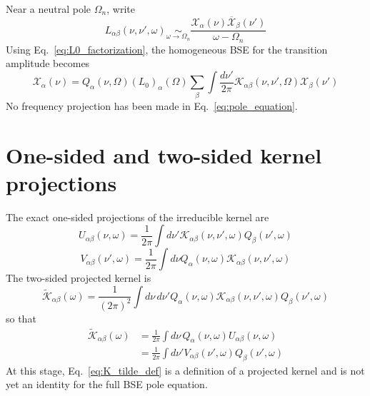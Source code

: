 \documentclass[aip,jcp,reprint,noshowkeys,superscriptaddress]{revtex4-1}
\begin{document}
Near a neutral pole $\Omega_n$, write
\begin{equation}
	L_{\alpha\beta}(\nu,\nu',\omega)
	\underset{\omega\to\Omega_n}{\sim}
	\frac{
	\mathcal X_\alpha(\nu)
	\overline{\mathcal X}_\beta(\nu')
	}{
	\omega-\Omega_n
	}
	\label{eq:pole_form}
\end{equation}
Using Eq.~\eqref{eq:L0_factorization}, the homogeneous BSE for the transition amplitude becomes
\begin{equation}
	\mathcal X_\alpha(\nu)
	=
	Q_\alpha(\nu,\Omega)
	(L_0)_\alpha(\Omega)
	\sum_\beta
	\int\frac{d\nu'}{2\pi}
	\mathcal K_{\alpha\beta}(\nu,\nu',\Omega)
	\mathcal X_\beta(\nu')
	\label{eq:pole_equation}
\end{equation}
No frequency projection has been made in Eq.~\eqref{eq:pole_equation}.

\section[Kernel projections]{One-sided and two-sided kernel projections}
\label{sec:projections}

The exact one-sided projections of the irreducible kernel are
\begin{equation}
	U_{\alpha\beta}(\nu,\omega)
	=
	\frac{1}{2\pi}
	\int d\nu'
	\mathcal K_{\alpha\beta}(\nu,\nu',\omega)
	Q_\beta(\nu',\omega)
	\label{eq:U_def}
\end{equation}
\begin{equation}
	V_{\alpha\beta}(\nu',\omega)
	=
	\frac{1}{2\pi}
	\int d\nu
	Q_\alpha(\nu,\omega)
	\mathcal K_{\alpha\beta}(\nu,\nu',\omega)
	\label{eq:V_def}
\end{equation}
The two-sided projected kernel is
\begin{equation}
	\widetilde{\mathcal K}_{\alpha\beta}(\omega)
	=
	\frac{1}{(2\pi)^2}
	\int d\nu\,d\nu'
	Q_\alpha(\nu,\omega)
	\mathcal K_{\alpha\beta}(\nu,\nu',\omega)
	Q_\beta(\nu',\omega)
	\label{eq:K_tilde_def}
\end{equation}
so that
\begin{align}
	\widetilde{\mathcal K}_{\alpha\beta}(\omega)
	&=
	\frac{1}{2\pi}
	\int d\nu\,
	Q_\alpha(\nu,\omega)
	U_{\alpha\beta}(\nu,\omega)
	\\
	&=
	\frac{1}{2\pi}
	\int d\nu'
	V_{\alpha\beta}(\nu',\omega)
	Q_\beta(\nu',\omega)
	\label{eq:K_tilde_one_sided}
\end{align}
At this stage, Eq.~\eqref{eq:K_tilde_def} is a definition of a projected kernel and is not yet an identity for the full BSE pole equation.
\end{document}
